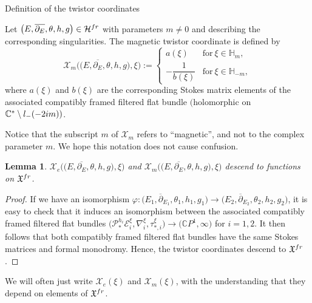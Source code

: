 \documentclass[11pt]{article}
\numberwithin{equation}{section}
\newtheorem{Lemma}[Theorem]{Lemma}
\numberwithin{equation}{section}
\newcommand{\CP}{\mathbb{C}P^1}
\newcommand{\MC}{\mathcal{X}_m}
\begin{document}
\begin{subsubsection} {Definition of the twistor coordinates}
\begin{Definition} Let $\bigl(E,\overline{\partial_E},\theta,h,g\bigr)\in \mathcal{H}^{{\rm fr}}$ with parameters $m\neq 0$ and  describing the corresponding singularities. The magnetic twistor coordinate is defined by
\begin{equation*}
 \mathcal{X}_m\bigl(\bigl(E,\overline{\partial_E},\theta,h,g\bigr),\xi\bigr):=\begin{cases}
 a(\xi) & \text{for} \ \xi \in \mathbb{H}_{m}, \\
 -\dfrac{1}{b(\xi)} & \text{for} \ \xi \in \mathbb{H}_{-m},
 \end{cases}
\end{equation*}
where $a(\xi)$ and $b(\xi)$ are the corresponding Stokes matrix elements of the associated compatibly framed filtered flat bundle \smash{$\bigl(\mathcal{P}^h_*\mathcal{E}^{\xi},\nabla^{\xi}, \tau_{*}^{\xi}\bigr)\to \bigl(\CP,\infty\bigr)$} $($holomorphic on $\mathbb{C}^*\setminus l_{-}(-2{\rm i}m))$.
\end{Definition}

\begin{Remark} Notice that the subscript $m$ of $\mathcal{X}_m$ refers to ``magnetic'', and not to the complex parameter $m$. We hope this notation does not cause confusion.
\end{Remark}
\begin{Lemma} $\mathcal{X}_e\bigl(\bigl(E,\overline{\partial_E},\theta,h,g\bigr),\xi\bigr)$ and $\MC\bigl(\bigl(E,\overline{\partial_E},\theta,h,g\bigr),\xi\bigr)$ descend to functions on $\mathfrak{X}^{{\rm fr}}$.

\end{Lemma}

\begin{proof}
If we have an isomorphism $\varphi\colon \bigl(E_1,\overline{\partial}_{E_1},\theta_1,h_1,g_1\bigr)\to \bigl(E_2,\overline{\partial}_{E_2},\theta_2,h_2,g_2\bigr)$, it is easy to check that it induces an isomorphism between the associated compatibly framed filtered flat bundles $\bigl(\mathcal{P}_{*}^{h_i}\mathcal{E}^{\xi}_i,\nabla^{\xi}_i, \tau_{*,i}^{\xi}\bigr)\to \bigl(\CP,\infty\bigr)$ for $i=1,2$. It then follows that both compatibly framed filtered flat bundles have the same Stokes matrices and formal monodromy. Hence, the twistor coordinates descend to $\mathfrak{X}^{{\rm fr}}$.
\end{proof}

We will often just write $\mathcal{X}_e(\xi)$ and $\MC(\xi)$, with the understanding that they depend on elements of $\mathfrak{X}^{{\rm fr}}$.


\end{subsubsection}
\end{document}
